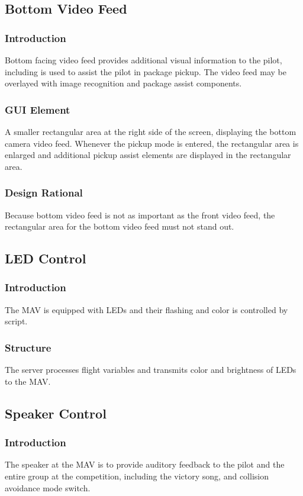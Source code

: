 \documentclass[onecolumn, oneside, letterpaper, draftclsnofoot, 10pt, compsoc]{IEEEtran}
\begin{document}
\subsection{Bottom Video Feed}
\subsubsection{Introduction}
Bottom facing video feed provides additional visual information to the pilot, including is used to assist the pilot in package pickup. The video feed may be overlayed with image recognition and package assist components.

\subsubsection{GUI Element}
A smaller rectangular area at the right side of the screen, displaying the bottom camera video feed. Whenever the pickup mode is entered, the rectangular area is enlarged and additional pickup assist elements are displayed in the rectangular area.

\subsubsection{Design Rational}
Because bottom video feed is not as important as the  front video feed, the rectangular area for the bottom video feed must not stand out.

\subsection{LED Control}
\subsubsection{Introduction}
The MAV is equipped with LEDs and their flashing and color is controlled by script.

\subsubsection{Structure}
The server processes flight variables and transmits color and brightness of LEDs to the MAV.

\subsection{Speaker Control}
\subsubsection{Introduction}
The speaker at the MAV is to provide auditory feedback to the pilot and the entire group at the competition, including the victory song, and collision avoidance mode switch.
\end{document}

